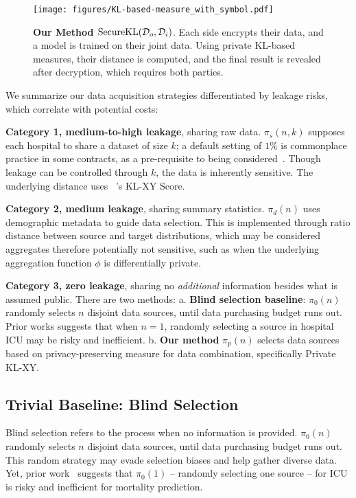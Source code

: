 \begin{figure}[ht]
  \centering
  \texttt{[image: figures/KL-based-measure\_with\_symbol.pdf]}
  \caption{\textbf{Our Method $\mathrm{SecureKL}(\mathcal{D}_o, \mathcal{D}_i)$}. Each side encrypts their data, and a model is trained on their joint data. Using private KL-based measures, their distance is computed, and the final result is revealed after decryption, which requires both parties.}
  \label{fig:method}
\end{figure}

We summarize our data acquisition strategies differentiated by leakage risks, which correlate with potential costs:

\textbf{Category 1, medium-to-high leakage}, sharing raw data. $\pi_s(n, k)$ supposes each hospital to share a dataset of size $k$; a default setting of $1\%$ is commonplace practice in some contracts, as a pre-requisite to being considered~\cite{lds}. Though leakage can be controlled through $k$, the data is inherently sensitive. The underlying distance uses ~\priorp's KL-XY Score.

\textbf{Category 2, medium leakage}, sharing summary statistics. $\pi_d(n)$ uses demographic metadata to guide data selection. This is implemented through ratio distance between source and target distributions, which may be considered aggregates therefore potentially not sensitive, such as when the underlying aggregation function $\phi$ is differentially private.

\textbf{Category 3, zero leakage}, sharing no \emph{additional} information besides what is assumed public. There are two methods: a. \textbf{Blind selection baseline}: $\pi_0(n)$ randomly selects $n$ disjoint data sources, until data purchasing budget runs out. Prior works suggests that when $n=1$, randomly selecting a source in hospital ICU may be risky and inefficient. b. \textbf{Our method} $\pi_p(n)$ selects data sources based on privacy-preserving measure for data combination, specifically Private KL-XY. 

\subsection{Trivial Baseline: Blind Selection}
Blind selection refers to the process when no information is provided. $\pi_0(n)$ randomly selects $n$ disjoint data sources, until data purchasing budget runs out. This random strategy may evade selection biases and help gather diverse data. Yet, prior work ~\priorp suggests that $\pi_0 (1)$ -- randomly selecting one source -- for ICU is risky and inefficient for mortality prediction.

